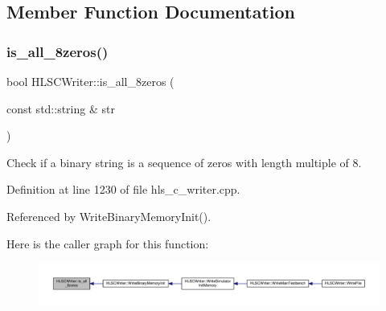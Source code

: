 \subsection{Member Function Documentation}
\mbox{\label{classHLSCWriter_aa5a58a39f5515f512fd0ed0bebf3c908}} 
\subsubsection{\texorpdfstring{is\+\_\+all\+\_\+8zeros()}{is\_all\_8zeros()}}
{\footnotesize\ttfamily bool H\+L\+S\+C\+Writer\+::is\+\_\+all\+\_\+8zeros (\begin{DoxyParamCaption}\item[{const std\+::string \&}]{str }\end{DoxyParamCaption})\hspace{0.3cm}{\ttfamily [protected]}}



Check if a binary string is a sequence of zeros with length multiple of 8. 



Definition at line 1230 of file hls\+\_\+c\+\_\+writer.\+cpp.



Referenced by Write\+Binary\+Memory\+Init().

Here is the caller graph for this function\+:
\nopagebreak
\begin{figure}[H]
\begin{center}
\leavevmode
\includegraphics[width=350pt]{d4/db1/classHLSCWriter_aa5a58a39f5515f512fd0ed0bebf3c908_icgraph}
\end{center}
\end{figure}
\mbox{\label{classHLSCWriter_a8fd01f9eda521085a428e6c46e4dc871}} 
